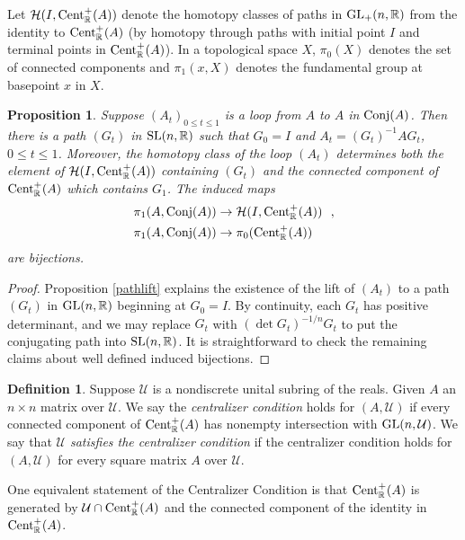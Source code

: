 \documentclass{amsart}
\newtheorem{prop}[theorem]{Proposition}
\theoremstyle{definition}
\newtheorem{definition}[theorem]{Definition}
\theoremstyle{remark}
\newcommand{\za}{\textnormal{Cent}_{\mathbb R}(A)}
\newcommand{\zaa}{\textnormal{Cent}^+_{\mathbb R}(A)}
\numberwithin{equation}{section}
\begin{document}
{{%
Let $\mathcal H(I, \zaa)$ denote the homotopy classes 
of paths in $\textnormal{GL}_+(n,\mathbb R)$ from 
the identity to $\zaa$ (by homotopy through paths with initial 
point $I$ and terminal points in $\zaa$).  
In a topological space $X$, $\pi_0(X)$ denotes the set of 
connected components and $\pi_1(x,X)$ denotes the fundamental group 
at basepoint $x$ in $X$. 

\begin{prop} 
Suppose $(A_t)_{0\leq t \leq 1}$ is a 
loop from $A$ to $A$ in $\textnormal{Conj}(A)$. 
Then there is a path $(G_t)$ in $\textnormal{SL}(n, \mathbb R)$ 
such that $G_0=I$ and  
$A_t=(G_t)^{-1}AG_t$, $0\leq t \leq 1$.  Moreover, the homotopy class of the 
loop $(A_t)$  determines both the element of 
$\mathcal H(I, \zaa)$ containing $(G_t)$ and the connected component of 
$\zaa$ which contains $G_1$. The induced maps 
\begin{align*} 
\pi_1(A,\textnormal{Conj}(A)) &\to 
\mathcal H(I, \zaa)\ \ ,  \\ 
\pi_1(A,\textnormal{Conj}(A)) &\to 
\pi_0(\zaa)
\end{align*}  
are bijections. 
\end{prop}
\begin{proof}
Proposition \ref{pathlift} 
explains the existence of the lift 
of $(A_t)$ to a path 
$(G_t)$ in $\textnormal{GL}(n,\mathbb R)$ beginning at $G_0=I$. 
By continuity, each $G_t$ has positive determinant,  
and we may replace $G_t$ with $(\det G_t)^{-1/n} G_t$ to put 
the conjugating path into $\textnormal{SL}(n,\mathbb R)$. It is straightforward 
to check the remaining claims about well defined induced bijections. 
\end{proof} 

\begin{definition} \label{centralizercondition} 
Suppose $\mathcal U$ is a nondiscrete unital subring of the reals. 
Given $A$  an $n\times n$ matrix over $\mathcal U$. We say 
the {\it  centralizer condition} holds for $(A, \mathcal U)$ if
every connected component of $\zaa $ 
has nonempty intersection with 
$\textnormal{GL}(n,\mathcal U)$.  We say that 
{\it 
$\mathcal U$ 
satisfies the 
centralizer condition} if the centralizer condition holds for 
$(A, \mathcal U)$ for every 
square matrix $A$ over $\mathcal U$. 
\end{definition} 
One equivalent statement of the 
 Centralizer Condition is that 
$\zaa $ is generated by 
$\mathcal U \cap \zaa  $ 
 and the connected component of the identity in 
$\zaa $. 
 
}}
\end{document}
